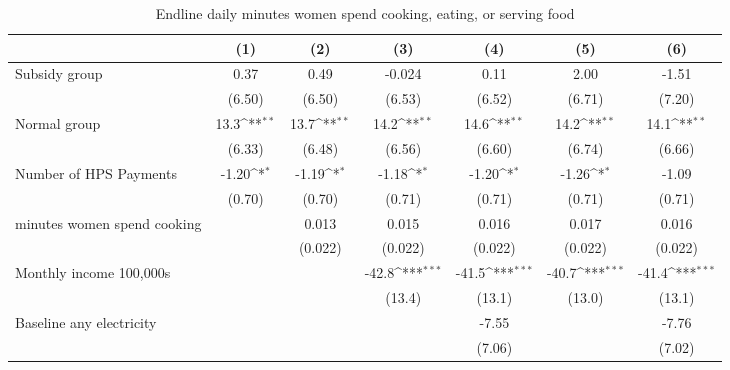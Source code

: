 \begin{table}[htbp]\centering
\def\sym#1{\ifmmode^{#1}\else\(^{#1}\)\fi}
\caption{Endline daily minutes women spend cooking, eating, or serving food}
\begin{tabular*}{1\hsize}{@{\hskip\tabcolsep\extracolsep\fill}l*{6}{c}}
\toprule
                &\multicolumn{1}{c}{(1)}         &\multicolumn{1}{c}{(2)}         &\multicolumn{1}{c}{(3)}         &\multicolumn{1}{c}{(4)}         &\multicolumn{1}{c}{(5)}         &\multicolumn{1}{c}{(6)}         \\
\midrule
Subsidy group   &     0.37         &     0.49         &   -0.024         &     0.11         &     2.00         &    -1.51         \\
                &   (6.50)         &   (6.50)         &   (6.53)         &   (6.52)         &   (6.71)         &   (7.20)         \\
Normal group    &     13.3\sym{**} &     13.7\sym{**} &     14.2\sym{**} &     14.6\sym{**} &     14.2\sym{**} &     14.1\sym{**} \\
                &   (6.33)         &   (6.48)         &   (6.56)         &   (6.60)         &   (6.74)         &   (6.66)         \\
Number of HPS Payments&    -1.20\sym{*}  &    -1.19\sym{*}  &    -1.18\sym{*}  &    -1.20\sym{*}  &    -1.26\sym{*}  &    -1.09         \\
                &   (0.70)         &   (0.70)         &   (0.71)         &   (0.71)         &   (0.71)         &   (0.71)         \\
minutes women spend cooking&                  &    0.013         &    0.015         &    0.016         &    0.017         &    0.016         \\
                &                  &  (0.022)         &  (0.022)         &  (0.022)         &  (0.022)         &  (0.022)         \\
Monthly income 100,000s&                  &                  &    -42.8\sym{***}&    -41.5\sym{***}&    -40.7\sym{***}&    -41.4\sym{***}\\
                &                  &                  &   (13.4)         &   (13.1)         &   (13.0)         &   (13.1)         \\
Baseline any electricity&                  &                  &                  &    -7.55         &                  &    -7.76         \\
                &                  &                  &                  &   (7.06)         &                  &   (7.02)         \\

\end{tabular*}
\end{table}
